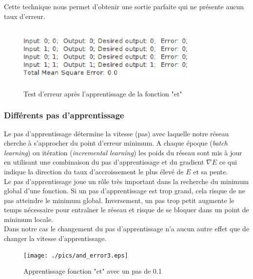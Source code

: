 \documentclass[twoside,openright,a4paper,11pt,french]{article}
\begin{document}
Cette technique nous permet d'obtenir une sortie parfaite qui ne présente
aucun taux d'erreur.



\begin{figure}[ht]
\centering
\includegraphics[width=9cm,height=3.2cm]{./pics/andtest2.eps}
\caption{Test d'erreur après l'apprentissage de la fonction "et"}
\label{fig:andtest2}
\end{figure}


\subsubsection{Différents pas d'apprentissage}

Le pas d'apprentissage détermine la vitesse (pas) avec laquelle notre réseau
cherche à s'approcher du point d'erreur minimum. 
A chaque époque ({\it batch learning}) ou itération ({\it incremental
learning}) les poids du réseau sont mis à jour en utilisant une combinaison du
pas d'apprentissage et du gradient $\nabla E$ ce qui indique la direction du taux
d'accroissement le plus élevé de $E$ et sa pente.\\

Le pas d'apprentissage joue un rôle très important dans la recherche du
minimum global d'une fonction. 
Si un pas d'apprentissage est trop grand, cela risque de ne pas atteindre le minimum global.
Inversement, un pas trop petit augmente le temps nécessaire pour entraîner le réseau et risque de
se bloquer dans un point de minimum locale.\\

Dans notre cas le changement du pas d'apprentissage n'a aucun autre effet que
de changer la vitesse d'apprentissage.


\begin{figure}[ht]
\centering
\texttt{[image: ./pics/and\_error3.eps]}
\caption{Apprentissage fonction "et" avec un pas de 0.1}
\label{fig:anderr3}
\end{figure}
\end{document}
